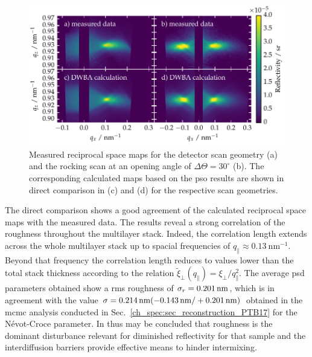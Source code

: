 \begin{figure}[htbp]
        \includegraphics[width=
        \textwidth]{img/PTB17_diffuse_simulation_vs_measurement} \caption{Measured  reciprocal space maps for the detector scan geometry (a) and the rocking scan at an opening angle of $\Delta\Theta=30^\circ$ (b). The corresponding calculated maps based on the \gls{pso} results are shown in direct comparison in (c) and (d) for the respective scan geometries.} \label{ch_diff:fig_PTB17_diffuse_comparisonWithTheory} 
\end{figure}
The direct comparison shows a good agreement of the calculated reciprocal space maps with the measured data. The results reveal a strong correlation of the roughness throughout the multilayer stack. Indeed, the correlation length extends across the whole multilayer stack up to spacial frequencies of $q_\parallel \approx \SI{0.13}{\nano\meter^{-1}}$. Beyond that frequency the correlation length reduces to values lower than the total stack thickness according to the relation $\tilde{\xi}_\perp(q_\parallel) = \xi_\perp / q_\parallel^2$. The average \gls{psd} parameters obtained show a \gls{rms} roughness of $\sigma_r=\nm{0.201}$, which is in agreement with the value $\sigma = \nm{0.214} (-\nm{0.143} / +\nm{0.201})$ obtained in the \gls{mcmc} analysis conducted in Sec.~\ref{ch_spec:sec_reconstruction_PTB17} for the N\'{e}vot-Croce parameter. In thus may be concluded that roughness is the dominant disturbance relevant for diminished reflectivity for that sample and the interdiffusion barriers provide effective means to hinder intermixing.

